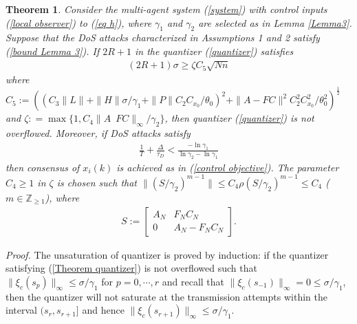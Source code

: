 \documentclass[letterpaper,journal,final,twocolumn]{IEEEtran}
\newtheorem{theorem}{Theorem}
\begin{document}
\begin{theorem}\label{Theorem 1}
	Consider the multi-agent system (\ref{system}) with control inputs (\ref{local observer}) to (\ref{eq h}), where $\gamma_1$ and $\gamma_2$ are selected as in Lemma \ref{Lemma3}. Suppose that the DoS attacks characterized in Assumptions 1 and 2 satisfy (\ref{bound Lemma 3}). 
	 If $2R+1$ in the quantizer (\ref{quantizer}) satisfies
	\begin{align}
	(2R+ 1 ) \sigma \ge  \zeta C_5 \sqrt{Nn} \label{Theorem quantizer}  
	\end{align}
where
$
C_5:=((C_3\|L\|+ \|H\| \sigma/\gamma_1 + \|P\|C_2C_{x_0}/\theta_0)^2  
+ \|A-FC\|^2 C_2 ^2 C_{x_0}^2/\theta_0 ^2)^{\frac{1}{2}}
$
and $\zeta: = \max\{1, C_4\|A\,\,\, FC\|_\infty /\gamma_2\}$, then quantizer (\ref{quantizer}) is not overflowed. 
Moreover, if DoS attacks satisfy
\begin{align}\label{DoS bound}
\frac{1}{T} + \frac{\Delta}{\tau_D} < \frac{-\ln \gamma_1}{\ln \gamma_2 -  \ln \gamma_1}
\end{align}
then consensus of $x_i(k)$ is achieved as in (\ref{control objective}). The parameter $C_4 \ge 1$ in $\zeta$ is chosen such that $\|(S/\gamma_2) ^{m-1}\| \le C_4 \rho(S/\gamma_2)^{m-1}\le C_4$ ($m \in \mathbb Z _{\ge 1}$), where
\begin{align}
S:=
\left[
	\begin{array}{cc}
A_N & F_N C_N\\
0  & A_N -F_NC_N
\end{array}
\right].
\end{align}
\end{theorem}




 




\emph{Proof.}  
The unsaturation of quantizer is proved by induction: if the quantizer satisfying (\ref{Theorem quantizer}) is not overflowed such that $\|\xi_c (s_p)\|_\infty \le \sigma / \gamma_1 $ for $p=0, \cdots, r$ and recall that $\|\xi_c (s_{-1})\|_\infty=0 \le \sigma / \gamma_1 $, then the quantizer will not saturate at the transmission attempts within the interval $(s_r, s_{r+1}]$ and hence $\|\xi _c (s_{r+1})\|_\infty \le \sigma / \gamma_1 $. 
\end{document}

